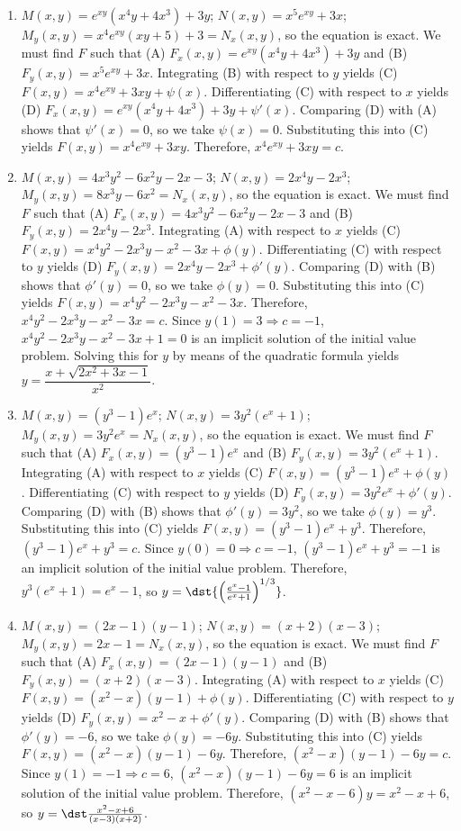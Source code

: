 \documentclass[openany]{book}
\newenvironment{sectionSolutions}{
 \begin{enumerate}[item-label={\thesection.\arabic{enumi}.}]
}{
 \end{enumerate}
}
\begin{document}
\begin{sectionSolutions}
\item
$M(x,y)=e^{xy}(x^4y+4x^3)+3y$;\;
$N(x,y)=x^5e^{xy}+3x$;\;
$M_y(x,y)=x^4e^{xy}(xy+5)+3=N_x(x,y)$,
so the  equation is  exact.
We must find $F$ such that
(A) $F_x(x,y)=e^{xy}(x^4y+4x^3)+3y$ and
(B) $F_y(x,y)=x^5e^{xy}+3x$.
Integrating (B) with respect to $y$ yields
(C) $F(x,y)=x^4e^{xy}+3xy+\psi(x)$.
Differentiating (C) with respect to $x$  yields
(D) $F_x(x,y)=e^{xy}(x^4y+4x^3)+3y+\psi'(x)$.
Comparing (D) with (A)  shows that
$\psi'(x)=0$, so we take
$\psi(x)=0$.
Substituting this into (C) yields
$F(x,y)=x^4e^{xy}+3xy$.
Therefore,  $x^4e^{xy}+3xy=c$.


\item
$M(x,y)=4x^3y^2-6x^2y-2x-3$;\;
$N(x,y)=2x^4y-2x^3$;\;
$M_y(x,y)=8x^3y-6x^2=N_x(x,y)$,
so the  equation is exact.
We must find $F$ such that
(A) $F_x(x,y)=4x^3y^2-6x^2y-2x-3$ and
(B) $F_y(x,y)=2x^4y-2x^3$.
Integrating (A) with respect to $x$ yields
(C) $F(x,y)=x^4y^2-2x^3y-x^2-3x+\phi(y)$.
Differentiating (C) with respect to $y$  yields
(D) $F_y(x,y)=2x^4y-2x^3+\phi'(y)$.
Comparing (D) with (B)  shows that
$\phi'(y)=0$, so we take
$\phi(y)=0$.
Substituting this into (C) yields
$F(x,y)=x^4y^2-2x^3y-x^2-3x$.
Therefore, $x^4y^2-2x^3y-x^2-3x=c$.
Since $y(1)=3\Rightarrow c=-1$,
$x^4y^2-2x^3y-x^2-3x+1=0$ is an implicit solution of the initial
value problem. Solving this for $y$ by means of the quadratic formula
yields $y=\dfrac{x+\sqrt{2x^2+3x-1}}{ x^2}$.


\item
$M(x,y)=(y^3-1)e^x$;\;
$N(x,y)=3y^2(e^x+1)$;\;
$M_y(x,y)=3y^2e^x=N_x(x,y)$,
so the  equation is exact.
We must find $F$ such that
(A) $F_x(x,y)=(y^3-1)e^x$ and
(B) $F_y(x,y)=3y^2(e^x+1)$.
Integrating (A) with respect to $x$ yields
(C) $F(x,y)=(y^3-1)e^x+\phi(y)$.
Differentiating (C) with respect to $y$  yields
(D) $F_y(x,y)=3y^2e^x+\phi'(y)$.
Comparing (D) with (B)  shows that
$\phi'(y)=3y^2$, so we take
$\phi(y)=y^3$.
Substituting this into (C) yields
$F(x,y)=(y^3-1)e^x+y^3$.
Therefore, $(y^3-1)e^x+y^3=c$.
Since $y(0)=0\Rightarrow c=-1$,
$(y^3-1)e^x+y^3=-1$ is an implicit solution of  the initial value
problem. Therefore, $y^3(e^x+1)=e^x-1$, so
$y=\dst{\left(\frac{e^x-1}{ e^x+1}\right)^{1/3}}$.


\item
$M(x,y)=(2x-1)(y-1)$;\;
$N(x,y)=(x+2)(x-3)$;\;
$M_y(x,y)=2x-1=N_x(x,y)$,
so the  equation is exact.
We must find $F$ such that
(A) $F_x(x,y)=(2x-1)(y-1)$ and
(B) $F_y(x,y)=(x+2)(x-3)$.
Integrating (A) with respect to $x$ yields
(C) $F(x,y)=(x^2-x)(y-1)+\phi(y)$.
Differentiating (C) with respect to $y$  yields
(D) $F_y(x,y)=x^2-x+\phi'(y)$.
Comparing (D) with (B)  shows that
$\phi'(y)=-6$, so we take
$\phi(y)=-6y$.
Substituting this into (C) yields
$F(x,y)=(x^2-x)(y-1)-6y$.
Therefore, $(x^2-x)(y-1)-6y=c$.
Since $y(1)=-1\Rightarrow c=6$,
$(x^2-x)(y-1)-6y=6$ is an implicit solution of  the initial value
problem. Therefore, $(x^2-x-6)y=x^2-x+6$, so
$y=\dst\frac{x^2-x+6}{(x-3)(x+2)}$.



\end{sectionSolutions}
\end{document}
